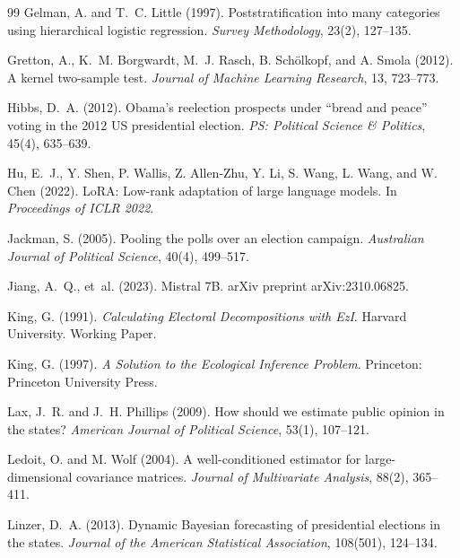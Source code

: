 \documentclass[12pt, letterpaper]{article}
\theoremstyle{definition}
\begin{document}
\begin{thebibliography}{99}
Gelman, A. and T.~C. Little (1997).
\newblock Poststratification into many categories using hierarchical logistic
  regression.
\newblock \textit{Survey Methodology}, 23(2), 127--135.

Gretton, A., K.~M. Borgwardt, M.~J. Rasch, B. Sch\"{o}lkopf, and A. Smola (2012).
\newblock A kernel two-sample test.
\newblock \textit{Journal of Machine Learning Research}, 13, 723--773.

Hibbs, D.~A. (2012).
\newblock Obama's reelection prospects under ``bread and peace'' voting in the
  2012 US presidential election.
\newblock \textit{PS: Political Science \& Politics}, 45(4), 635--639.

Hu, E.~J., Y. Shen, P. Wallis, Z. Allen-Zhu, Y. Li, S. Wang, L. Wang, and
  W. Chen (2022).
\newblock LoRA: Low-rank adaptation of large language models.
\newblock In \textit{Proceedings of ICLR 2022}.

Jackman, S. (2005).
\newblock Pooling the polls over an election campaign.
\newblock \textit{Australian Journal of Political Science}, 40(4), 499--517.

Jiang, A.~Q., et~al. (2023).
\newblock Mistral 7B.
\newblock arXiv preprint arXiv:2310.06825.

King, G. (1991).
\newblock \textit{Calculating Electoral Decompositions with EzI}.
\newblock Harvard University. Working Paper.

King, G. (1997).
\newblock \textit{A Solution to the Ecological Inference Problem}.
\newblock Princeton: Princeton University Press.

Lax, J.~R. and J.~H. Phillips (2009).
\newblock How should we estimate public opinion in the states?
\newblock \textit{American Journal of Political Science}, 53(1), 107--121.

Ledoit, O. and M. Wolf (2004).
\newblock A well-conditioned estimator for large-dimensional covariance matrices.
\newblock \textit{Journal of Multivariate Analysis}, 88(2), 365--411.

Linzer, D.~A. (2013).
\newblock Dynamic Bayesian forecasting of presidential elections in the states.
\newblock \textit{Journal of the American Statistical Association},
  108(501), 124--134.


\end{thebibliography}
\end{document}
